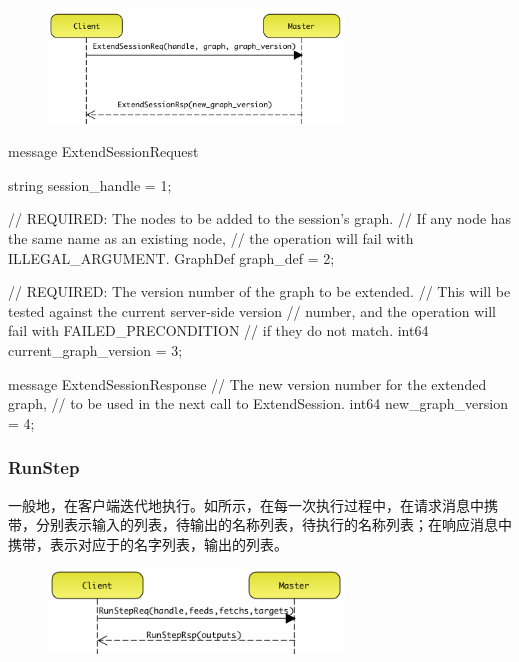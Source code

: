 \begin{content}
\begin{figure}[H]
\centering
\includegraphics[width=0.7\textwidth]{figures/dist-ms-extend-sess-req.png}
\caption{}
 \label{fig:dist-ms-extend-sess-req}
\end{figure}

\begin{leftbar}
\begin{c++}
message ExtendSessionRequest {
  string session_handle = 1;

  // REQUIRED: The nodes to be added to the session's graph. 
  // If any node has the same name as an existing node, 
  // the operation will fail with ILLEGAL\_ARGUMENT.
  GraphDef graph_def = 2;

  // REQUIRED: The version number of the graph to be extended. 
  // This will be tested against the current server-side version 
  // number, and the operation will fail with FAILED\_PRECONDITION 
  // if they do not match.
  int64 current_graph_version = 3;
}

message ExtendSessionResponse {
  // The new version number for the extended graph, 
  // to be used in the next call to ExtendSession.
  int64 new_graph_version = 4;
}
\end{c++}
\end{leftbar}

\subsubsection{RunStep}

一般地，在客户端迭代地执行。如所示，在每一次执行过程中，在请求消息中携带，分别表示输入的列表，待输出的名称列表，待执行的名称列表；在响应消息中携带，表示对应于的名字列表，输出的列表。

\begin{figure}[H]
\centering
\includegraphics[width=0.7\textwidth]{figures/dist-ms-run-step-req.png}
\caption{}
 \label{fig:dist-ms-run-step-req}
\end{figure}


\end{content}
